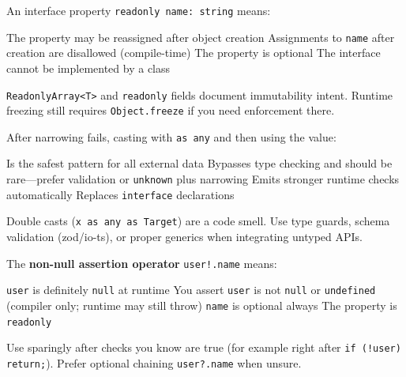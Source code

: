 \question[4]
An interface property \lstinline[style=tsinline]|readonly name: string| means:
\begin{choices}
  \choice The property may be reassigned after object creation
  \CorrectChoice Assignments to \lstinline[style=tsinline]|name| after creation are disallowed (compile-time)
  \choice The property is optional
  \choice The interface cannot be implemented by a class
\end{choices}
\begin{solution}
  \lstinline[style=tsinline]|ReadonlyArray<T>| and \lstinline[style=tsinline]|readonly| fields document immutability intent. Runtime freezing still requires \lstinline[style=tsinline]|Object.freeze| if you need enforcement there.
\end{solution}

\question[4]
After narrowing fails, casting with \lstinline[style=tsinline]|as any| and then using the value:
\begin{choices}
  \choice Is the safest pattern for all external data
  \CorrectChoice Bypasses type checking and should be rare---prefer validation or \lstinline[style=tsinline]|unknown| plus narrowing
  \choice Emits stronger runtime checks automatically
  \choice Replaces \lstinline[style=tsinline]|interface| declarations
\end{choices}
\begin{solution}
  Double casts (\lstinline[style=tsinline]|x as any as Target|) are a code smell. Use type guards, schema validation (zod/io-ts), or proper generics when integrating untyped APIs.
\end{solution}

\question[4]
The \textbf{non-null assertion operator} \lstinline[style=tsinline]|user!.name| means:
\begin{choices}
  \choice \lstinline[style=tsinline]|user| is definitely \lstinline[style=tsinline]|null| at runtime
  \CorrectChoice You assert \lstinline[style=tsinline]|user| is not \lstinline[style=tsinline]|null| or \lstinline[style=tsinline]|undefined| (compiler only; runtime may still throw)
  \choice \lstinline[style=tsinline]|name| is optional always
  \choice The property is \lstinline[style=tsinline]|readonly|
\end{choices}
\begin{solution}
  Use sparingly after checks you know are true (for example right after \lstinline[style=tsinline]|if (!user) return;|). Prefer optional chaining \lstinline[style=tsinline]|user?.name| when unsure.
\end{solution}

